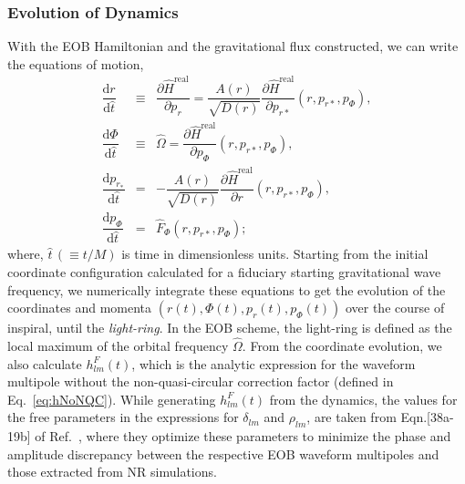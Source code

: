 \documentclass[aps,
prd,
amsmath,
amssymb,
twocolumn,
floatfix,
groupedaddress]{revtex4-1}
\newcommand{\D}{\mathrm{d}}
\newcommand{\real}{\mathrm{real}}
\begin{document}
\subsubsection{Evolution of Dynamics}\label{sec:level3:DynamicalEvolution}
With the EOB Hamiltonian and the gravitational flux constructed, we can write the equations of motion,
\begin{eqnarray}
\dfrac{\D r}{\D\hat{t}} &\equiv & \dfrac{\partial \hat{H}^{\real}}{\partial p_r} = \dfrac{A(r)}{\sqrt{D(r)}}\dfrac{\partial \hat{H}^{\real}}{\partial p_{r*}} (r, p_{r*}, p_{\Phi}) ,\\
\dfrac{\D\Phi}{\D\hat{t}} &\equiv & \hat{\Omega} = \dfrac{\partial \hat{H}^{\real}}{\partial p_{\Phi}} (r, p_{r*}, p_{\Phi}) , \\ 
\dfrac{\D p_{r_*}}{\D\hat{t}} &=& -\dfrac{A(r)}{\sqrt{D(r)}} \dfrac{\partial \hat{H}^{\real}}{\partial r} (r, p_{r*}, p_{\Phi}) ,\\
\dfrac{\D p_{\Phi}}{\D\hat{t}} &=& \hat{F}_{\Phi}(r, p_{r*}, p_{\Phi}) ;
\end{eqnarray}
where, $\hat{t}\,(\equiv t/M)$ is time in dimensionless units. Starting from the initial coordinate configuration calculated for a fiduciary starting gravitational wave frequency, we numerically integrate these equations to get the evolution of the coordinates and momenta $(r(t),\Phi(t),p_r(t),p_{\Phi}(t))$ over the course of inspiral, until the \emph{light-ring}. In the EOB scheme, the light-ring is defined as the local maximum of the orbital frequency $\hat{\Omega}$. From the coordinate evolution, we also calculate $h^F_{lm}(t)$, which is the analytic expression for the waveform multipole without the non-quasi-circular correction factor (defined in Eq.~\eqref{eq:hNoNQC}). While generating $h^F_{lm}(t)$ from the dynamics, the values for the free parameters in the expressions for $\delta_{lm}$ and $\rho_{lm}$, are taken from Eqn.[38a-19b] of Ref.~\citep{BuonannoEOBv2Main}, where they optimize these parameters to minimize the phase and amplitude discrepancy between the respective EOB waveform multipoles and 
those extracted from NR simulations.
\end{document}
